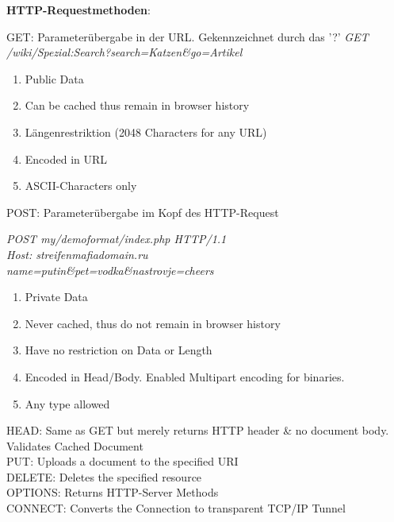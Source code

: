 \documentclass[11pt]{article}
\begin{document}
\begin{enumerate}[\thesection .1]
\begin{enumerate}[$\diamond$]
        \textbf{HTTP-Requestmethoden}:
        \begin{addmargin}[1em]{1em}
            GET: Parameterübergabe in der URL. Gekennzeichnet durch das '?'
            \emph{GET /wiki/Spezial:Search?search=Katzen\&go=Artikel}
            \begin{enumerate}[$\diamond$]
                \item Public Data
                \item Can be cached thus remain in browser history
                \item Längenrestriktion (2048 Characters for any URL)
                \item Encoded in URL
                \item ASCII-Characters only
            \end{enumerate}
        \end{addmargin}
        POST: Parameterübergabe im Kopf des HTTP-Request
        \begin{addmargin}[1em]{1em}
            \emph{POST my/demoformat/index.php HTTP/1.1\\
            Host: streifenmafiadomain.ru\\
            name=putin\&pet=vodka\&nastrovje=cheers}
            \begin{enumerate}[$\diamond$]
                \item Private Data
                \item Never cached, thus do not remain in browser history
                \item Have no restriction on Data or Length
                \item Encoded in Head/Body. Enabled Multipart encoding for binaries.
                \item Any type allowed
            \end{enumerate}
        \end{addmargin}
        HEAD: Same as GET but merely returns HTTP header \& no document body. Validates Cached Document\\
        PUT: Uploads a document to the specified URI\\
        DELETE: Deletes the specified resource\\
        OPTIONS: Returns HTTP-Server Methods\\
        CONNECT: Converts the Connection to transparent TCP/IP Tunnel\\
    \end{enumerate}


\end{enumerate}
\end{document}
